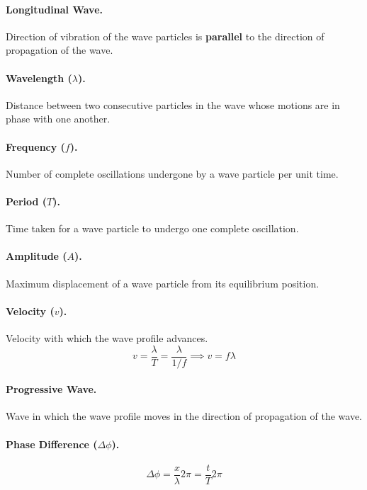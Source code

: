 \documentclass{article}
\begin{document}
\paragraph{Longitudinal Wave.} Direction of vibration of the wave particles is
\textbf{parallel} to the direction of propagation of the wave.

\paragraph{Wavelength ($\lambda$).} Distance between two consecutive particles
in the wave whose motions are in phase with one another.

\paragraph{Frequency ($f$).} Number of complete oscillations undergone by a wave
particle per unit time.

\paragraph{Period ($T$).} Time taken for a wave particle to undergo one complete
oscillation.

\paragraph{Amplitude ($A$).} Maximum displacement of a wave particle from its
equilibrium position.

\paragraph{Velocity ($v$).} Velocity with which the wave profile advances.
\begin{equation} v = \frac{\lambda}{T} = \frac{\lambda}{1/f} \implies v =
f\lambda \end{equation}

\paragraph{Progressive Wave.} Wave in which the wave profile moves in the
direction of propagation of the wave.

\paragraph{Phase Difference ($\Delta\phi$).} \begin{equation} \Delta\phi =
\frac{x}{\lambda} 2\pi = \frac{t}{T} 2\pi \end{equation}
\end{document}
